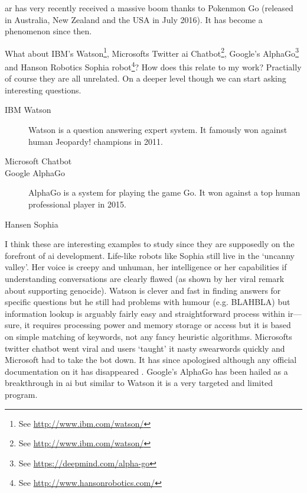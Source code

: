 
\gls{ar} has very recently received a massive boom thanks to Pokenmon Go (released in Australia, New Zealand and the USA in July 2016). It has become a phenomenon since then.

What about IBM's Watson\footnote{See \url{http://www.ibm.com/watson/}}, Microsofts Twitter \gls{ai} Chatbot\footnote{See \url{http://www.ibm.com/watson/}}, Google's AlphaGo\footnote{See \url{https://deepmind.com/alpha-go}} and Hanson Robotics Sophia robot\footnote{See \url{http://www.hansonrobotics.com/}}? How does this relate to my work? Practially of course they are all unrelated. On a deeper level though we can start asking interesting questions. 

\begin{description}
  \item[IBM Watson] Watson is a question answering expert system. It famously won against human Jeopardy! champions in 2011.
  \item[Microsoft Chatbot] 
  \item[Google AlphaGo] AlphaGo is a system for playing the game Go. It won against a top human professional player in 2015.
  \item[Hansen Sophia]
\end{description}

I think these are interesting examples to study since they are supposedly on the forefront of \gls{ai} development. Life-like robots like Sophia still live in the `uncanny valley'. Her voice is creepy and unhuman, her intelligence or her capabilities if understanding conversations are clearly flawed (as shown by her viral remark about supporting genocide). Watson is clever and fast in finding answers for specific questions but he still had problems with humour (e.g. BLAHBLA) but information lookup is arguably fairly easy and straightforward process within \gls{ir}---sure, it requires processing power and memory storage or access but it is based on simple matching of keywords, not any fancy heuristic algorithms. Microsofts twitter chatbot went viral and users `taught' it nasty swearwords  quickly and Microsoft had to take the bot down. It has since apologised although any official documentation on it has disappeared . Google's AlphaGo has been hailed as a breakthrough in \gls{ai} but similar to Watson it is a very targeted and limited program. 

